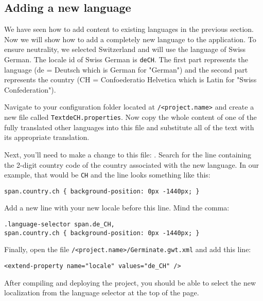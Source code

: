 \subsection{Adding a new language}
\label{sec:i18n}
We have seen how to add content to existing languages in the previous section. Now we will show how to add a completely new language to the application. To ensure neutrality, we selected Switzerland and will use the language of Swiss German. The locale id of Swiss German is \texttt{de\textunderscore CH}. The first part represents the language (de = Deutsch which is German for "German") and the second part represents the country (CH = Confoederatio Helvetica which is Latin for "Swiss Confederation").

Navigate to your configuration folder located at \instanceStuff\texttt{/<project.name>} and create a new file called \texttt{Text\textunderscore de\textunderscore CH.properties}. Now copy the whole content of one of the fully translated other languages into this file and substitute all of the text with its appropriate translation.

Next, you'll need to make a change to this file: . Search for the line containing the 2-digit country code of the country associated with the new language. In our example, that would be \texttt{CH} and the line looks something like this:

\begin{lstlisting}[style=CSS]
span.country.ch { background-position: 0px -1440px; }
\end{lstlisting}
\noindent
Add a new line with your new locale before this line. Mind the comma:

\begin{lstlisting}[style=CSS]
.language-selector span.de_CH,
span.country.ch { background-position: 0px -1440px; }
\end{lstlisting}
\noindent
Finally, open the file \instanceStuff\texttt{/<project.name>/Germinate.gwt.xml} and add this line:

\begin{lstlisting}[style=Xml]
<extend-property name="locale" values="de_CH" />
\end{lstlisting}
\noindent
After compiling and deploying the project, you should be able to select the new localization from the language selector at the top of the page.

